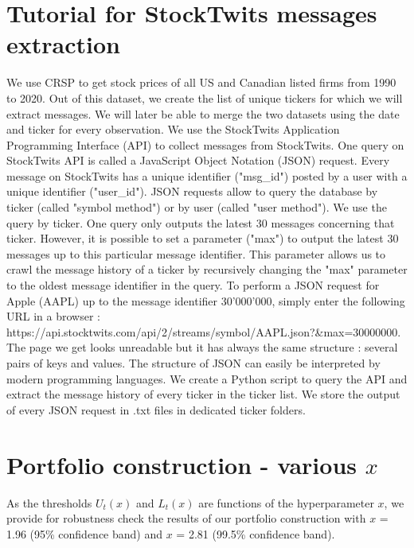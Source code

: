 \section{Tutorial for StockTwits messages extraction}
We use CRSP to get stock prices of all US and Canadian listed firms from 1990 to 2020. Out of this dataset, we create the list of unique tickers for which we will extract messages. We will later be able to merge the two datasets using the date and ticker for every observation. We use the StockTwits Application Programming Interface (API) to collect messages from StockTwits. One query on StockTwits API is called a JavaScript Object Notation (JSON) request. Every message on StockTwits has a unique identifier ("msg\_id") posted by a user with a unique identifier ("user\_id"). JSON requests allow to query the database by ticker (called "symbol method") or by user (called "user method"). We use the query by ticker. One query only outputs the latest 30 messages concerning that ticker. However, it is possible to set a parameter ("max") to output the latest 30 messages up to this particular message identifier. This parameter allows us to crawl the message history of a ticker by recursively changing the "max" parameter to the oldest message identifier in the query. To perform a JSON request for Apple (AAPL) up to the message identifier 30'000'000, simply enter the following URL in a browser : https://api.stocktwits.com/api/2/streams/symbol/AAPL.json?\&max=30000000. The page we get looks unreadable but it has always the same structure : several pairs of keys and values. The structure of JSON can easily be interpreted by modern programming languages. We create a Python script to query the API and extract the message history of every ticker in the ticker list. We store the output of every JSON request in .txt files in dedicated ticker folders.




\clearpage
\newpage

\section{Portfolio construction - various $x$}
As the thresholds $U_t(x)$ and $L_t(x)$ are functions of the hyperparameter $x$, we provide for robustness check the results of our portfolio construction with $x$ = 1.96  (95\% confidence band) and $x$ = 2.81 (99.5\% confidence band).
